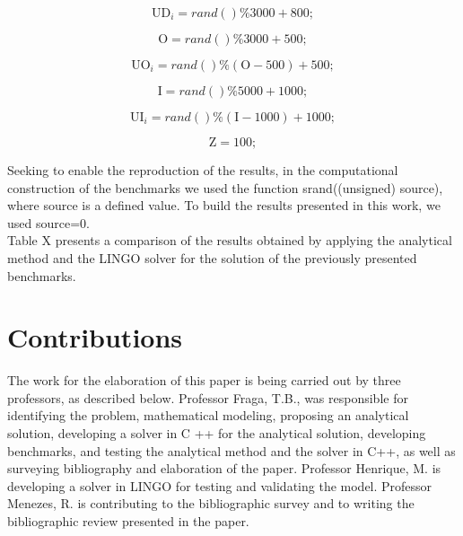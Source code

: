 \documentclass[preprint,12pt,authoryear]{elsarticle}
\begin{document}
\begin{equation}
\textrm{UD}_i = rand()\%3000 + 800;
\end{equation}

\begin{equation}
\textrm{O} = rand()\%3000 + 500;
\end{equation}

\begin{equation}
\textrm{UO}_i = rand()\%(\textrm{O}-500) + 500;
\end{equation}

\begin{equation}
\textrm{I} = rand()\%5000 + 1000;
\end{equation}

\begin{equation}
\textrm{UI}_i = rand()\%(\textrm{I}-1000) + 1000;
\end{equation}

\begin{equation}
\textrm{Z} = 100;
\end{equation}

Seeking to enable the reproduction of the results, in the computational construction of the benchmarks we used the function srand((unsigned) source), where source is a defined value. To build the results presented in this work, we used source=0. \\

Table X presents a comparison of the results obtained by applying the analytical method and the LINGO solver for the solution of the previously presented benchmarks.

\section{Contributions}
\label{sec:contributions}

The work for the elaboration of this paper is being carried out by three professors, as described below. Professor Fraga, T.B., was responsible for identifying the problem, mathematical modeling, proposing an analytical solution, developing a solver in C ++ for the analytical solution, developing benchmarks, and testing the analytical method and the solver in C++, as well as surveying bibliography and elaboration of the paper. Professor Henrique, M.  is developing a solver in LINGO for testing and validating the model. Professor Menezes, R. is contributing to the bibliographic survey and to writing the bibliographic review presented in the paper. 
\end{document}
